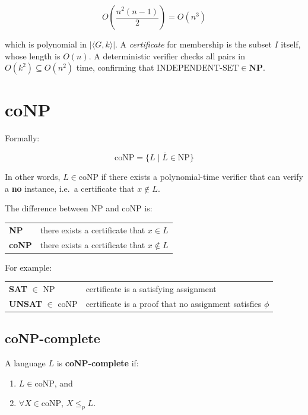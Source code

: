 \documentclass[12pt,a4paper,openany]{article}
\begin{document}
\[
O\!\left(\frac{n^2(n-1)}{2}\right) = O(n^3)
\]

which is polynomial in $|\langle G, k \rangle|$. A \emph{certificate} for membership is the subset $I$ itself, whose length is $O(n)$. 
A deterministic verifier checks all pairs in $O(k^2) \subseteq O(n^2)$ time, confirming that $\text{INDEPENDENT-SET} \in \mathbf{NP}$.

\section{coNP}

Formally:

\[
\mathrm{coNP} = \{ L \mid \overline{L} \in \mathrm{NP} \}
\]

In other words, $L \in \mathrm{coNP}$ if there exists a polynomial-time verifier
that can verify a \textbf{no} instance, i.e.\ a certificate that $x \notin L$.

The difference between NP and coNP is:

\begin{center}
\begin{tabular}{ll}
\textbf{NP} & there exists a certificate that $x \in L$ \\
\textbf{coNP} & there exists a certificate that $x \notin L$ \\
\end{tabular}
\end{center}

For example:

\begin{center}
\begin{tabular}{ll}
\textbf{SAT} $\in$ NP & certificate is a satisfying assignment \\
\textbf{UNSAT} $\in$ coNP & certificate is a proof that no assignment satisfies $\phi$ \\
\end{tabular}
\end{center}

\subsection{coNP-complete}

A language $L$ is \textbf{coNP-complete} if:

\begin{enumerate}
    \item $L \in \mathrm{coNP}$, and
    \item $\forall X \in \mathrm{coNP}$, $X \leq_p L$.
\end{enumerate}
\end{document}
